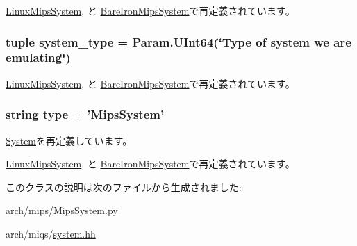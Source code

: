\hyperlink{classMipsSystem_1_1LinuxMipsSystem_a261e4081ddd1f0823eccc0f042086c27}{LinuxMipsSystem}, と \hyperlink{classMipsSystem_1_1BareIronMipsSystem_a261e4081ddd1f0823eccc0f042086c27}{BareIronMipsSystem}で再定義されています。\hypertarget{classMipsSystem_1_1MipsSystem_af401252d15d9cecde29d1fdcbaba250d}{
\subsubsection[{system\_\-type}]{\setlength{\rightskip}{0pt plus 5cm}tuple system\_\-type = Param.UInt64(\char`\"{}Type of system we are emulating\char`\"{})}}
\label{classMipsSystem_1_1MipsSystem_af401252d15d9cecde29d1fdcbaba250d}


\hyperlink{classMipsSystem_1_1LinuxMipsSystem_acfe3506cfe10e05a2cb2c2973dc5dad2}{LinuxMipsSystem}, と \hyperlink{classMipsSystem_1_1BareIronMipsSystem_acfe3506cfe10e05a2cb2c2973dc5dad2}{BareIronMipsSystem}で再定義されています。\hypertarget{classMipsSystem_1_1MipsSystem_acce15679d830831b0bbe8ebc2a60b2ca}{
\subsubsection[{type}]{\setlength{\rightskip}{0pt plus 5cm}string type = '{\bf MipsSystem}'}}
\label{classMipsSystem_1_1MipsSystem_acce15679d830831b0bbe8ebc2a60b2ca}


\hyperlink{classSystem_1_1System_acce15679d830831b0bbe8ebc2a60b2ca}{System}を再定義しています。

\hyperlink{classMipsSystem_1_1LinuxMipsSystem_acce15679d830831b0bbe8ebc2a60b2ca}{LinuxMipsSystem}, と \hyperlink{classMipsSystem_1_1BareIronMipsSystem_acce15679d830831b0bbe8ebc2a60b2ca}{BareIronMipsSystem}で再定義されています。

このクラスの説明は次のファイルから生成されました:\begin{DoxyCompactItemize}
\item 
arch/mips/\hyperlink{MipsSystem_8py}{MipsSystem.py}\item 
arch/miqs/\hyperlink{arch_2miqs_2system_8hh}{system.hh}\end{DoxyCompactItemize}
